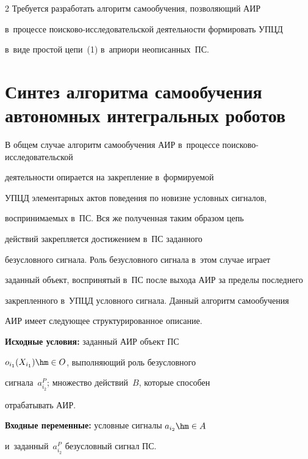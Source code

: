 \begin{multicols}{2}
  Требуется разработать алгоритм са\-мо\-обуче\-ния, поз\-во\-ля\-ющий АИР 


в~процессе по\-иско\-во-ис\-сле\-до\-ва\-тель\-ской де\-я\-тель\-ности формировать \mbox{УПЦД} 


в~виде прос\-той цепи~(1) в~априори неописанных~ПС.


  


\section{Синтез алгоритма самообучения автономных интегральных роботов}





  В общем случае алгоритм самообучения АИР в~процессе по\-ис\-ко\-во-ис\-сле\-до\-ва\-тель\-ской 


  де\-я\-тель\-ности опирается на за\-креп\-ле\-ние в~формируемой 


УПЦД элементарных актов поведения по новизне условных сигналов, 


воспринимаемых в~ПС. Вся же полученная таким образом цепь 


действий закрепляется достижением в~ПС заданного 


без\-услов\-но\-го сигнала. Роль безуслов\-но\-го сигнала в~этом случае играет 


заданный объект, воспринятый в~ПС после выхода АИР за пределы последнего 


за\-креп\-лен\-но\-го в~УПЦД условного сигнала. Данный алгоритм са\-мо\-обуче\-ния 


АИР имеет сле\-ду\-ющее структурированное описание. 


  


\noindent


  \textbf{Исходные условия:} заданный АИР объект ПС 


$o_{i_1}(X_{i_1})\hm\in O$, выполняющий роль без\-услов\-но\-го 


сигнала~$a_{i_2}^P$; множество действий~$B$, которые способен 


отрабатывать АИР.


  


 \noindent


  \textbf{Входные переменные:} услов\-ные сигналы $a_{i_2}\hm\in A$ 


и~заданный~$a^P_{i_2}$ безусловный сигнал ПС.



\end{multicols}
